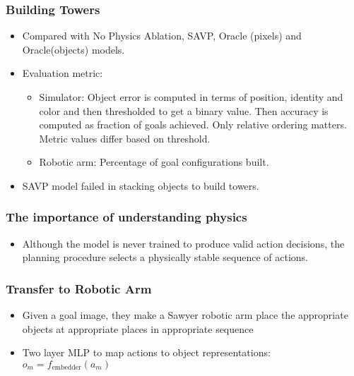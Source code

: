 \documentclass{article}
\begin{document}
    \subsubsection{Building Towers}\label{subsubsec:Reasoning_about_Physical_Interactions_with_Object_Oriented_Prediction_and_Planning_(O2P2):building-towers}
    \begin{itemize}
        \item Compared with No Physics Ablation, SAVP, Oracle (pixels) and Oracle(objects) models.
        \item Evaluation metric:
        \begin{itemize}
            \item Simulator: Object error is computed in terms of position, identity and color and then thresholded to get a binary value.
            Then accuracy is computed as fraction of goals achieved.
            Only relative ordering matters.
            Metric values differ based on threshold.
            \item Robotic arm: Percentage of goal configurations built.
        \end{itemize}
        \item SAVP model failed in stacking objects to build towers.
    \end{itemize}

    \subsubsection{The importance of understanding physics}\label{subsubsec:Reasoning_about_Physical_Interactions_with_Object_Oriented_Prediction_and_Planning_(O2P2):the-importance-of-understanding-physics}
    \begin{itemize}
        \item Although the model is never trained to produce valid action decisions, the planning procedure selects a physically stable sequence of actions.
    \end{itemize}

    \subsubsection{Transfer to Robotic Arm}\label{subsubsec:Reasoning_about_Physical_Interactions_with_Object_Oriented_Prediction_and_Planning_(O2P2):transfer-to-robotic-arm}
    \begin{itemize}
        \item Given a goal image, they make a Sawyer robotic arm place the appropriate objects at appropriate places in appropriate sequence
        \item Two layer MLP to map actions to object representations: $o_m = f_{\textrm{embedder}}(a_m)$
    \end{itemize}
\end{document}
